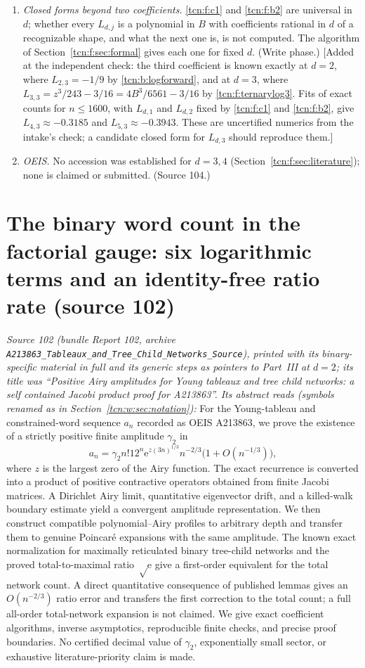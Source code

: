 \documentclass[11pt,letterpaper]{article}
\newcommand{\ee}{\mathrm e}
\theoremstyle{remark}
\begin{document}
\begin{enumerate}[itemsep=2pt]
\item \emph{Closed forms beyond two coefficients.} \eqref{tcn:f:c1} and \eqref{tcn:f:b2} are universal in $d$; whether every $L_{d,j}$ is a polynomial in $B$ with coefficients rational in $d$ of a recognizable shape, and what the next one is, is not computed. The algorithm of Section~\ref{tcn:f:sec:formal} gives each one for fixed $d$. (Write phase.) \textup{[}Added at the independent check: the third coefficient is known exactly at $d=2$, where $L_{2,3}=-1/9$ by \eqref{tcn:b:logforward}, and at $d=3$, where $L_{3,3}=z^3/243-3/16=4B^3/6561-3/16$ by \eqref{tcn:f:ternarylog3}. Fits of exact counts for $n\le1600$, with $L_{d,1}$ and $L_{d,2}$ fixed by \eqref{tcn:f:c1} and \eqref{tcn:f:b2}, give $L_{4,3}\approx-0.3185$ and $L_{5,3}\approx-0.3943$. These are uncertified numerics from the intake's check; a candidate closed form for $L_{d,3}$ should reproduce them.\textup{]}
\item \emph{OEIS.} No accession was established for $d=3,4$ (Section~\ref{tcn:f:sec:literature}); none is claimed or submitted. (Source 104.)
\end{enumerate}

\part{The binary word count in the factorial gauge: six logarithmic terms and an identity-free ratio rate (source 102)}\label{tcn:part:w}
\emph{Source 102 (bundle Report 102, archive \textup{\nolinkurl{A213863_Tableaux_and_Tree_Child_Networks_Source}}), printed with its binary-specific material in full and its generic steps as pointers to Part~III at $d=2$; its title was ``Positive Airy amplitudes for Young tableaux and tree child networks: a self contained Jacobi product proof for A213863''. Its abstract reads (symbols renamed as in Section~\ref{tcn:w:sec:notation}):} For the Young-tableau and constrained-word sequence $a_n$ recorded as OEIS A213863, we prove the existence of a strictly positive finite amplitude $\gamma_2$ in
\[
 a_n=\gamma_2 n!12^n\ee^{z(3n)^{1/3}}n^{-2/3}\bigl(1+O(n^{-1/3})\bigr),
\]
where $z$ is the largest zero of the Airy function. The exact recurrence is converted into a product of positive contractive operators obtained from finite Jacobi matrices. A Dirichlet Airy limit, quantitative eigenvector drift, and a killed-walk boundary estimate yield a convergent amplitude representation. We then construct compatible polynomial--Airy profiles to arbitrary depth and transfer them to genuine Poincar\'e expansions with the same amplitude. The known exact normalization for maximally reticulated binary tree-child networks and the proved total-to-maximal ratio $\sqrt\ee$ give a first-order equivalent for the total network count. A direct quantitative consequence of published lemmas gives an $O(n^{-2/3})$ ratio error and transfers the first correction to the total count; a full all-order total-network expansion is not claimed. We give exact coefficient algorithms, inverse asymptotics, reproducible finite checks, and precise proof boundaries. No certified decimal value of $\gamma_2$, exponentially small sector, or exhaustive literature-priority claim is made.
\end{document}
